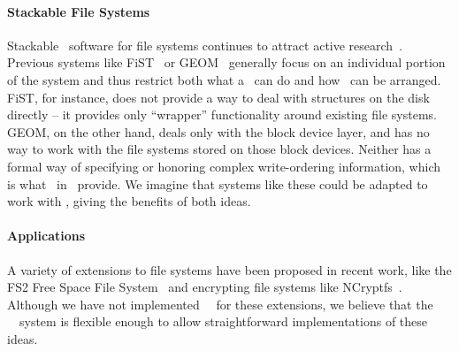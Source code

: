 \paragraph{Stackable File Systems}


Stackable \module\ software for file systems continues to attract active
research~\cite{rosenthal90evolving, heidemann91layered, skinner93stacking,
heidemann94filesystem,zadok99extending,
zadok00fist,wright03ncryptfs,wright06versatility}. Previous
systems like FiST~\cite{zadok00fist} or GEOM~\cite{geom} generally focus on
an individual portion of the system and thus restrict both what a \module\
can do and how \modules\ can be arranged. FiST, for instance, does not
provide a way to deal with structures on the disk directly -- it provides
only ``wrapper'' functionality around existing file
systems. %
GEOM, on the other hand, deals only with the block device layer, and has no
way to work with the file systems stored on those block devices. Neither
has a formal way of specifying or honoring complex write-ordering
information, which is what \chdescs\ in \Kudos\ provide. We imagine that
systems like these could be adapted to work with \chdescs, giving the
benefits of both ideas.

\paragraph{Applications}

A variety of extensions to file systems have been proposed in recent work, like
the FS2 Free Space File System~\cite{huang05fs2} and encrypting file systems
like NCryptfs~\cite{wright03ncryptfs}. Although we have not implemented \Kudos\
\modules\ for these extensions, we believe that the \Kudos\ \module\ system is
flexible enough to allow straightforward implementations of these ideas.
\todo{Cite type-safe disks?}

